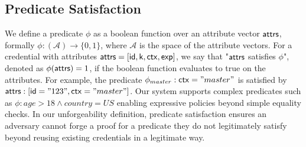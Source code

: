 \subsection{Predicate Satisfaction}
We define a predicate $\phi$ as a boolean function over an attribute vector $\mathsf{attrs}$, formally  $\phi: (\mathcal{A}) \rightarrow \{0,1\}$, where $\mathcal{A}$ is the space of the attribute vectors. 
For a credential with attributes $\mathsf{attrs} = [\mathsf{id}, \mathsf{k}, \mathsf{ctx}, \mathsf{exp}]$, we say that "$\mathsf{attrs}$ satisfies $\phi$", denoted as $\phi(\mathsf{attrs}) = 1$, if the boolean function evaluates to true on the attributes.
For example, the predicate $\phi_{master}:\mathsf{ctx} = "master"$ is satisfied by $\mathsf{attrs}: [\mathsf{id}="123", \mathsf{ctx}="master"]$. Our system supports complex predicates such as $\phi: age > 18 \wedge country = US$ enabling expressive policies beyond simple equality checks. In our unforgeability definition, predicate satisfaction ensures an adversary cannot forge a proof for a predicate they do not legitimately satisfy beyond reusing existing credentials in a legitimate way.

